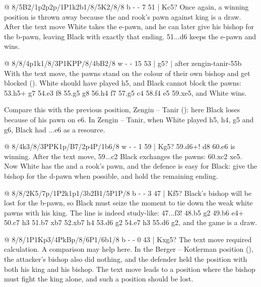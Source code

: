 @ 8/5B2/1p2p2p/1P1k2b1/8/5K2/8/8 b - - 7 51 | Kc5?
Once again, a winning position is thrown away because the  and rook's pawn against king is a draw. After the text move White takes the e-pawn, and he can later give his bishop for the b-pawn, leaving Black with exactly that ending. 51...\K d6 keeps the e-pawn and wins.

@ 8/8/4p1k1/8/3P1KPP/8/4bB2/8 w - - 15 53 | g5? | after zengin-tanir-55b
With the text move, the pawns stand on the colour of their own bishop and get blocked (). White should have played h5, and Black cannot block the pawns: 53.h5+ \K g7 54.\B e3 \K f8 55.\K g5 \K g8 56.\K h4 \K f7 57.g5 \B c4 58.\B f4 e5 59.\B xe5, and White wins.

Compare this with the previous position, Zengin -- Tanir (): here Black loses because of his pawn on e6. In Zengin -- Tanir, when White played h5, \K h4, g5 and g6, Black had ...\K e6 as a resource.

@ 8/4k3/8/3PPK1p/B7/2p4P/1b6/8 w - - 1 59 | Kg5?
59.d6+! \K d8 60.e6 is winning. After the text move, 59...c2 Black exchanges the pawns: 60.\B xc2 \B xe5. Now White has the  and a rook's pawn, and the defence is easy for Black: give the bishop for the d-pawn when possible, and hold the remaining ending.

@ 8/8/2K5/7p/1P2k1p1/3b2B1/5P1P/8 b - - 3 47 | Kf5?
Black's bishop will be lost for the b-pawn, so Black must seize the moment to tie down the weak white pawns with his king. The line is indeed study-like: 47...\K f3! 48.b5 \K g2 49.b6 \B e4+ 50.\K c7 \K h3 51.b7 \B xb7 52.\K xb7 h4 53.\B d6 \K g2 54.\B e7 \K h3 55.\B d6 \K g2, and the game is a draw.

@ 8/8/1P1Kp3/4PkBp/8/6P1/6b1/8 b - - 0 43 | Kxg5?
The text move required calculation. A comparison may help here. In the Berger -- Kotlerman position (), the attacker's bishop also did nothing, and the defender held the position with both his king and his bishop. The text move leads to a position where the bishop must fight the king alone, and such a position should be lost.

